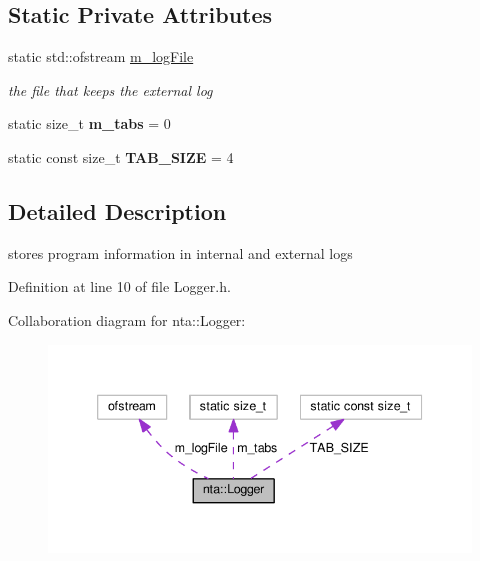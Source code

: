 \subsection*{Static Private Attributes}
\begin{DoxyCompactItemize}
\item 
\mbox{\label{classnta_1_1Logger_aba94cb82e0a5f5dd72719c80de5c3571}} 
static std\+::ofstream \hyperlink{classnta_1_1Logger_aba94cb82e0a5f5dd72719c80de5c3571}{m\+\_\+log\+File}
\begin{DoxyCompactList}\small\item\em the file that keeps the external log \end{DoxyCompactList}\item 
\mbox{\label{classnta_1_1Logger_a853462b3f8725ff55d36a14220335d72}} 
static size\+\_\+t {\bfseries m\+\_\+tabs} = 0
\item 
\mbox{\label{classnta_1_1Logger_a15106f36caca5fb9554163f3ae47663f}} 
static const size\+\_\+t {\bfseries T\+A\+B\+\_\+\+S\+I\+ZE} = 4
\end{DoxyCompactItemize}


\subsection{Detailed Description}
stores program information in internal and external logs 

Definition at line 10 of file Logger.\+h.



Collaboration diagram for nta\+:\+:Logger\+:\nopagebreak
\begin{figure}[H]
\begin{center}
\leavevmode
\includegraphics[width=339pt]{d4/d22/classnta_1_1Logger__coll__graph}
\end{center}
\end{figure}


